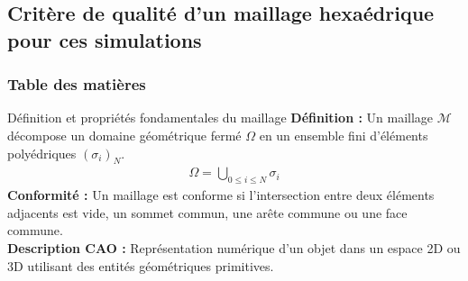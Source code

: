 \documentclass{beamer}
\begin{document}
\subsection{Critère de qualité d'un maillage hexaédrique pour ces simulations}

\begin{frame}
    \frametitle{Table des matières}
    \tableofcontents[currentsubsection, sectionstyle=show/shaded, subsectionstyle=show/shaded/hide]
\end{frame}
\begin{frame}{Définition et propriétés fondamentales du maillage}
    \small{
        \textbf{Définition :} Un maillage $\mathcal{M}$ décompose un domaine géométrique fermé $\Omega$ en un ensemble fini d'éléments polyédriques $(\sigma_i)_N$. 
        \begin{align*}
            \Omega = \bigcup_{0 \leq i \leq N}{\sigma_i}
        \end{align*}
    }
    \newline
    \small{
        \textbf{Conformité :} Un maillage est conforme si l'intersection entre deux éléments adjacents est vide, un sommet commun, une arête commune ou une face commune.\\
    }
    \vspace{0.5cm}
    \small{
        \textbf{Description CAO :} Représentation numérique d'un objet dans un espace 2D ou 3D utilisant des entités géométriques primitives.
    }
\end{frame}
\end{document}
